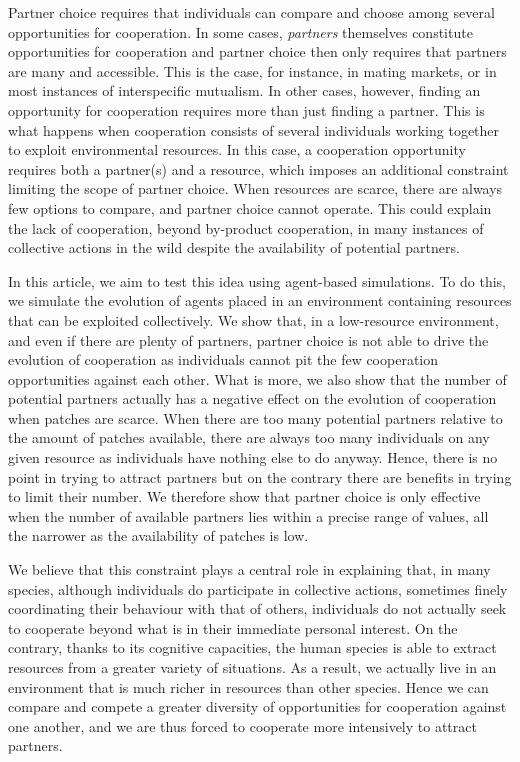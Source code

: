 Partner choice requires that individuals can compare and choose among several opportunities for cooperation. In some cases, \textit{partners} themselves constitute opportunities for cooperation and partner choice then only requires that partners are many and accessible. This is the case, for instance, in mating markets, or in most instances of interspecific mutualism. In other cases, however, finding an opportunity for cooperation requires more than just finding a partner. This is what happens when cooperation consists of several individuals working together to exploit environmental resources. In this case, a cooperation opportunity requires both a partner(s) and a resource, which imposes an additional constraint limiting the scope of partner choice. When resources are scarce, there are always few options to compare, and partner choice cannot operate. This could explain the lack of cooperation, beyond by-product cooperation, in many instances of collective actions in the wild despite the availability of potential partners.

In this article, we aim to test this idea using agent-based simulations. To do this, we simulate the evolution of agents placed in an environment containing resources that can be exploited collectively. We show that, in a low-resource environment, and even if there are plenty of partners, partner choice is not able to drive the evolution of cooperation as individuals cannot pit the few cooperation opportunities against each other. What is more, we also show that the number of potential partners actually has a negative effect on the evolution of cooperation when patches are scarce. When there are too many potential partners relative to the amount of patches available, there are always too many individuals on any given resource as individuals have nothing else to do anyway. Hence, there is no point in trying to attract partners but on the contrary there are benefits in trying to limit their number. We therefore show that partner choice is only effective when the number of available partners lies within a precise range of values, all the narrower as the availability of patches is low.

We believe that this constraint plays a central role in explaining that, in many species, although individuals do participate in collective actions, sometimes finely coordinating their behaviour with that of others, individuals do not actually seek to cooperate beyond what is in their immediate personal interest. On the contrary, thanks to its cognitive capacities, the human species is able to extract resources from a greater variety of situations. As a result, we actually live in an environment that is much richer in resources than other species. Hence we can compare and compete a greater diversity of opportunities for cooperation against one another, and we are thus forced to cooperate more intensively to attract partners.


